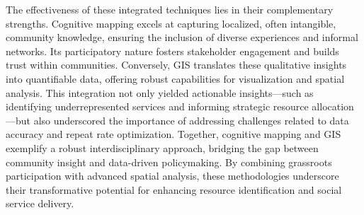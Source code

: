 The effectiveness of these integrated techniques lies in their complementary strengths. Cognitive mapping excels at capturing localized, often intangible, community knowledge, ensuring the inclusion of diverse experiences and informal networks. Its participatory nature fosters stakeholder engagement and builds trust within communities. Conversely, GIS translates these qualitative insights into quantifiable data, offering robust capabilities for visualization and spatial analysis. This integration not only yielded actionable insights—such as identifying underrepresented services and informing strategic resource allocation—but also underscored the importance of addressing challenges related to data accuracy and repeat rate optimization. Together, cognitive mapping and GIS exemplify a robust interdisciplinary approach, bridging the gap between community insight and data-driven policymaking. By combining grassroots participation with advanced spatial analysis, these methodologies underscore their transformative potential for enhancing resource identification and social service delivery.







